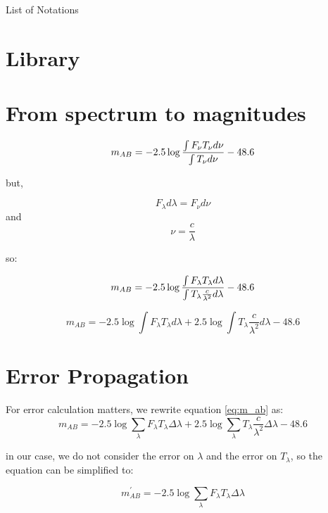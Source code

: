 \documentclass[11pt]{article}
\renewcommand{\nomname}{List of Notations}
\def\ni{\noindent}                                       %
\begin{document}
\nomname
\printnomenclature

\section{Library}



\section{From spectrum to magnitudes}

\begin{equation}
m_{AB} = -2.5 \log{ {\int F_\nu T_\nu d\nu}\over{\int T_\nu d\nu} } - 48.6
\end{equation}



\ni but,

$$ F_\lambda d\lambda = F_\nu d\nu $$ and $$ \nu = \frac{c}{\lambda} $$

so:

\begin{equation}
m_{AB} = -2.5 \log { {\int F_\lambda T_\lambda d\lambda}\over{\int T_\lambda \frac{c}{\lambda^2} d\lambda} } - 48.6
\end{equation}

\begin{equation}
\label{eq:m_ab}
m_{A B} = -2.5 \log \int F_\lambda T_\lambda d\lambda + 2.5 \log \int T_\lambda \frac{c}{\lambda^2} d\lambda - 48.6
\end{equation}

\section{Error Propagation}

For error calculation matters, we rewrite equation \ref{eq:m_ab} as:
\begin{equation}
\label{eq:m_ab_sum}
m_{A B} = -2.5 \log \sum_\lambda F_\lambda T_\lambda \Delta \lambda + 2.5 \log \sum_\lambda T_\lambda \frac{c}{\lambda^2} \Delta\lambda - 48.6
\end{equation}

\ni in our case, we do not consider the error on $\lambda$ and the error on
$T_\lambda$, so the equation can be simplified to:

\begin{equation}
m_{A B}^\prime = -2.5 \log \sum_\lambda F_\lambda T_\lambda \Delta \lambda
\end{equation}
\end{document}
